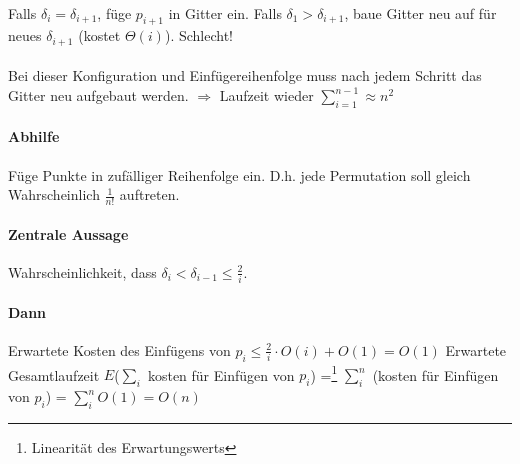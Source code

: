 \paragraph*{} Falls $\delta_i = \delta_{i+1}$, füge $p_{i+1}$ in Gitter ein. Falls $\delta_1 > \delta_{i+1}$, baue Gitter neu auf für neues $\delta_{i+1}$ (kostet $\Theta(i)$). Schlecht!


\paragraph*{} Bei dieser Konfiguration und Einfügereihenfolge muss nach jedem Schritt das Gitter neu aufgebaut werden. $\Rightarrow$ Laufzeit wieder $\sum\limits_{i=1}^{n-1} \approx n^2$

\paragraph*{Abhilfe} Füge Punkte in zufälliger Reihenfolge ein. D.h. jede Permutation soll gleich Wahrscheinlich $\frac{1}{n!}$ auftreten. %

\paragraph*{Zentrale Aussage} Wahrscheinlichkeit, dass $\delta_i < \delta_{i-1} \leq \frac{2}{i}$.

\paragraph*{Dann} Erwartete Kosten des Einfügens von $p_i \leq \frac{2}{i} \cdot O(i) + O(1) = O(1)$
Erwartete Gesamtlaufzeit $E$($\sum\limits_i$ kosten für Einfügen von $p_i$) =\footnote{Linearität des Erwartungswerts} $\sum\limits_i^n$ (kosten für Einfügen von $p_i$) = $\sum\limits_i^n O(1) = O(n)$






